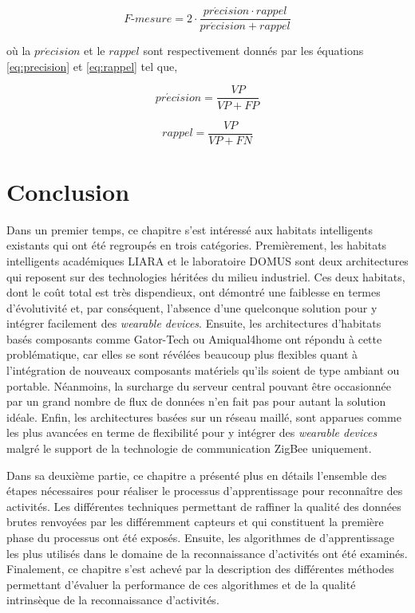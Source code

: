 \begin{equation}
	\label{eq:f-score}
	F\mbox{-} mesure = 2 \cdot \frac{pr\acute{e}cision \cdot rappel}{pr\acute{e}cision + rappel}
\end{equation}

\noindent où la $pr\acute{e}cision$ et le $rappel$ sont respectivement donnés par les équations \ref{eq:precision} et \ref{eq:rappel} tel que,

\begin{equation}
	\label{eq:precision}
	pr\acute{e}cision = \frac{VP}{VP+FP}
\end{equation}

\begin{equation}
	\label{eq:rappel}
	rappel = \frac{VP}{VP+FN}
\end{equation}

\section{Conclusion}

Dans un premier temps, ce chapitre s'est intéressé aux habitats intelligents existants qui ont été regroupés en trois catégories. Premièrement, les habitats intelligents académiques \acs{LIARA} et le laboratoire \acs{DOMUS} sont deux architectures qui reposent sur des technologies héritées du milieu industriel. Ces deux habitats, dont le coût total est très dispendieux, ont démontré une faiblesse en termes d'évolutivité et, par conséquent, l'absence d'une quelconque solution pour y intégrer facilement des \textit{wearable devices}. Ensuite, les architectures d'habitats basés composants comme Gator-Tech ou Amiqual4home ont répondu à cette problématique, car elles se sont révélées beaucoup plus flexibles quant à l'intégration de nouveaux composants matériels qu'ils soient de type ambiant ou portable. Néanmoins, la surcharge du serveur central pouvant être occasionnée par un grand nombre de flux de données n'en fait pas pour autant la solution idéale. Enfin, les architectures basées sur un réseau maillé, sont apparues comme les plus avancées en terme de flexibilité pour y intégrer des \textit{wearable devices} malgré le support de la technologie de communication ZigBee uniquement.

Dans sa deuxième partie, ce chapitre a présenté plus en détails l’ensemble des étapes nécessaires pour réaliser le processus d'apprentissage pour reconnaître des activités. Les différentes techniques permettant de raffiner la qualité des données brutes renvoyées par les différemment capteurs et qui constituent la première phase du processus ont été exposés. Ensuite, les algorithmes de d'apprentissage les plus utilisés dans le domaine de la reconnaissance d'activités ont été examinés. Finalement, ce chapitre s'est achevé par la description des différentes méthodes permettant d'évaluer la performance de ces algorithmes et de la qualité intrinsèque de la reconnaissance d'activités.
